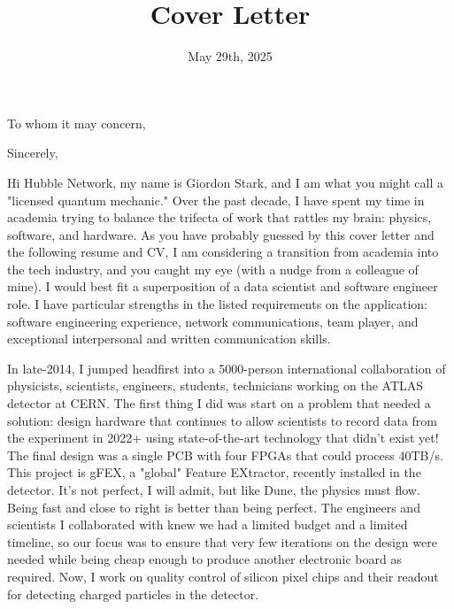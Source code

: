 \documentclass[10pt,letterpaper,sans]{moderncv} %
\title{Cover Letter}
\begin{document}
\date{May 29th, 2025}
\opening{To whom it may concern,}
\closing{Sincerely,}

\makelettertitle
\vspace*{-1em}

Hi Hubble Network, my name is Giordon Stark, and I am what you might call a "licensed quantum mechanic." Over the past decade, I have spent my time in academia trying to balance the trifecta of work that rattles my brain: physics, software, and hardware. As you have probably guessed by this cover letter and the following resume and CV, I am considering a transition from academia into the tech industry, and you caught my eye (with a nudge from a colleague of mine). I would best fit a superposition of a data scientist and software engineer role. I have particular strengths in the listed requirements on the application: software engineering experience, network communications, team player, and exceptional interpersonal and written communication skills.

In late-2014, I jumped headfirst into a 5000-person international collaboration of physicists, scientists, engineers, students, technicians working on the ATLAS detector at CERN. The first thing I did was start on a problem that needed a solution: design hardware that continues to allow scientists to record data from the experiment in 2022+ using state-of-the-art technology that didn't exist yet! The final design was a single PCB with four FPGAs that could process 40TB/s. This project is gFEX, a "global" Feature EXtractor, recently installed in the detector. It's not perfect, I will admit, but like Dune, the physics must flow. Being fast and close to right is better than being perfect. The engineers and scientists I collaborated with knew we had a limited budget and a limited timeline, so our focus was to ensure that very few iterations on the design were needed while being cheap enough to produce another electronic board as required. Now, I work on quality control of silicon pixel chips and their readout for detecting charged particles in the detector.
\end{document}
